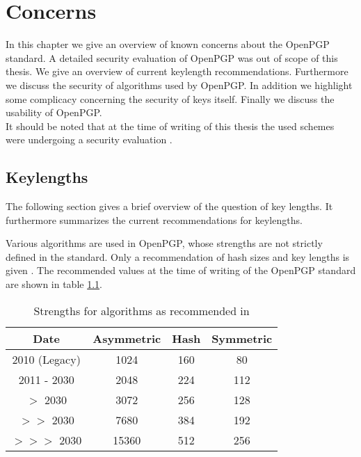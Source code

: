 \chapter{Concerns} \label{chapter:concerns}


In this chapter we give an overview of known concerns about the OpenPGP standard. A detailed security evaluation of OpenPGP was out of scope of this thesis. We give an overview of current keylength recommendations. Furthermore we discuss the security of algorithms used by OpenPGP. In addition we highlight some complicacy concerning the security of keys itself. Finally we discuss the usability of OpenPGP. \\

It should be noted that at the time of writing of this thesis the used schemes were undergoing a security evaluation \citep{TUB2015}.



\section{Keylengths}

The following section gives a brief overview of the question of key lengths. It furthermore summarizes the current recommendations for keylengths. 

Various algorithms are used in OpenPGP, whose strengths are not strictly defined in the standard. 
Only a recommendation of hash sizes and key lengths is given \citep[section 14]{RFC4880}.
The recommended values at the time of writing of the OpenPGP standard are shown in table \ref{tab:keylengths}.

\begin{table}[h]
	\centering
	\begin{tabular}{|c|c|c|c|}
		\hline Date & 			Asymmetric & Hash & Symmetric \\ 
		\hline\hline 2010 (Legacy) & 1024 & 160 & 80 \\ 
		\hline 2011 - 2030 & 2048 & 224 & 112 \\ 
		\hline $>$ 2030 		   & 3072 & 256 & 128 \\ 
		\hline $>>$ 2030       & 7680 & 384 & 192 \\ 
		\hline $>>>$ 2030     & 15360 & 512 & 256 \\ 
		\hline 
	\end{tabular}
	\caption{Strengths for algorithms as recommended in \citep[section 14]{RFC4880}} 
		\label{tab:keylengths}
\end{table}

